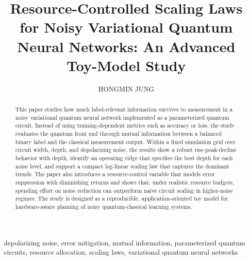 \documentclass[]{ieeeaccess}
\begin{document}
\newlength{\xfigwd}
\setlength{\xfigwd}{\columnwidth}


\title{Resource-Controlled Scaling Laws for Noisy Variational Quantum Neural Networks: An Advanced Toy-Model Study}

\author{\uppercase{HONGMIN JUNG}}
\address[1]{Laurel Springs School, Ojai, CA 93023 USA; Bucheon, Gyeonggi-do, Republic of Korea (e-mail: junghongmin13@gmail.com)}

\begin{abstract}
This paper studies how much label-relevant information survives to measurement in a noisy
variational quantum neural network implemented as a parameterized quantum circuit. Instead of
using training-dependent metrics such as accuracy or loss, the study evaluates the quantum
front end through mutual information between a balanced binary label and the classical
measurement output. Within a fixed simulation grid over circuit width, depth, and depolarizing
noise, the results show a robust rise-peak-decline behavior with depth, identify an operating
ridge that specifies the best depth for each noise level, and support a compact log-linear
scaling law that captures the dominant trends. The paper also introduces a resource-control
variable that models error suppression with diminishing returns and shows that, under realistic
resource budgets, spending effort on noise reduction can outperform naive circuit scaling in
higher-noise regimes. The study is designed as a reproducible, application-oriented toy model
for hardware-aware planning of noisy quantum-classical learning systems.
\end{abstract}

\begin{keywords}
depolarizing noise, error mitigation, mutual information, parameterized quantum circuits, resource allocation, scaling laws, variational quantum neural networks
\end{keywords}

\titlepgskip=-15pt
\maketitle
\end{document}

